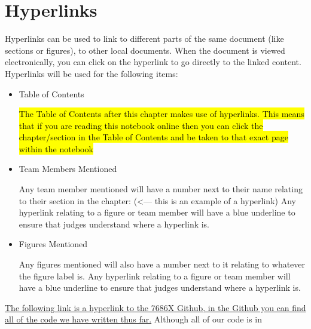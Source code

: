 \section*{Hyperlinks}
    Hyperlinks can be used to link to different parts of the same document (like sections or figures), to other local documents. When the document is viewed electronically, you can click on the hyperlink to go directly to the linked content. Hyperlinks will be used for the following items:
    \begin{itemize}
        \item Table of Contents 
        
        \hl{The Table of Contents after this chapter makes use of hyperlinks. This means that if you are reading this notebook online then you can click the chapter/section in the Table of Contents and be taken to that exact page within the notebook}
        \item Team Members Mentioned 
        
        Any team member mentioned will have a number next to their name relating to their section in the chapter:  (\textless--- this is an example of a hyperlink) Any hyperlink relating to a figure or team member will have a blue underline to ensure that judges understand where a hyperlink is.
        \item Figures Mentioned

        Any figures mentioned will also have a number next to it relating to whatever the figure label is. Any hyperlink relating to a figure or team member will have a blue underline to ensure that judges understand where a hyperlink is.
    \end{itemize}
    \href{https://github.com/trainlover08/7686X_24-25_High_Stakes}{The following link is a hyperlink to the 7686X Github, in the Github you can find all of the code we have written thus far.} Although all of our code is in 
\pagebreak